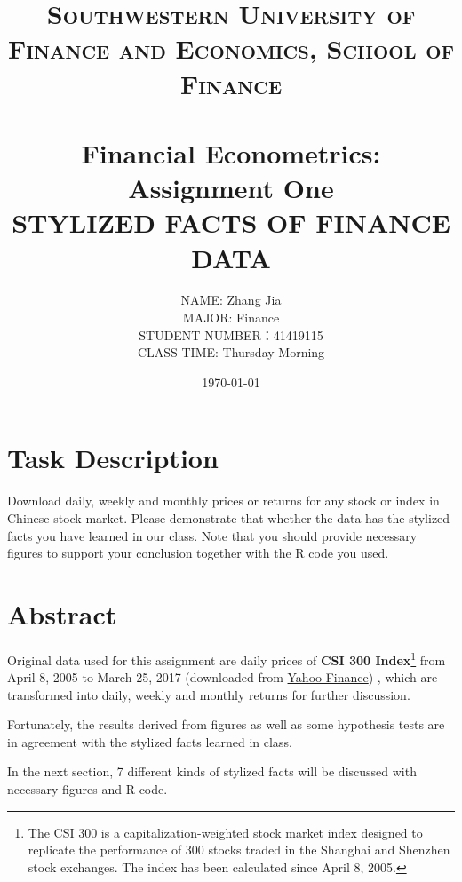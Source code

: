 \documentclass[paper=a4, fontsize=11pt]{scrartcl} %
\title{	
\normalfont \normalsize
\textsc{Southwestern University of Finance and Economics, School of Finance} \\ [25pt] %
\horrule{0.5pt} \\[0.4cm] %
\huge Financial Econometrics: Assignment One\\ %
\Large STYLIZED FACTS OF FINANCE DATA
\horrule{2pt} \\[0.5cm] %
}
\author{NAME: Zhang Jia\\MAJOR: Finance\\STUDENT NUMBER：41419115\\CLASS TIME: Thursday Morning} %
\date{\normalsize\today} %
\numberwithin{equation}{section} %
\numberwithin{figure}{section} %
\numberwithin{table}{section} %
\begin{document}
\maketitle %



\section{Task Description}

Download daily, weekly and monthly prices or returns for any stock or index in Chinese stock
market. Please demonstrate that whether the data has the stylized facts you have learned in
our class. Note that you should provide necessary figures to support your conclusion together
with the R code you used.

\section{Abstract}

Original data used for this assignment are daily prices of \textbf{CSI 300 Index}\footnote{ The CSI 300 is a capitalization-weighted stock market index designed to replicate the performance of 300 stocks traded in the Shanghai and Shenzhen stock exchanges. The index has been calculated since April 8, 2005.} from April 8, 2005 to March 25, 2017 (downloaded from \href{http://finance.yahoo.com/}{Yahoo Finance}) , which are transformed into daily, weekly and monthly returns for further discussion.\par
Fortunately, the results derived from figures as well as some hypothesis tests are in agreement with the stylized facts learned in class. \par
In the next section, 7 different kinds of stylized facts will be discussed with necessary figures and R code.
\bigskip
\bigskip
\end{document}
